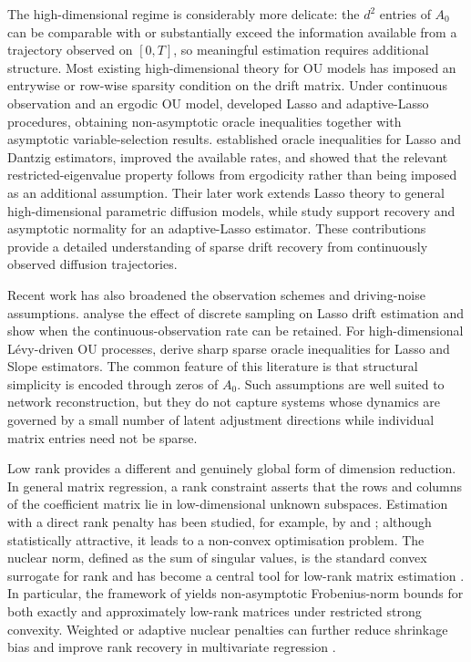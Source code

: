 \documentclass[11pt]{article}
\begin{document}
The high-dimensional regime is considerably more delicate: the $d^2$ entries of $A_0$ can be comparable with or substantially exceed the information available from a trajectory observed on $[0,T]$, so meaningful estimation requires additional structure.
Most existing high-dimensional theory for OU models has imposed an entrywise or row-wise sparsity condition on the drift matrix.  Under continuous observation and an ergodic OU model, \citet{GaiffasMatulewicz2019} developed Lasso and adaptive-Lasso procedures, obtaining non-asymptotic oracle inequalities together with asymptotic variable-selection results.  \citet{CiolekMarushkevychPodolskij2020} established oracle inequalities for Lasso and Dantzig estimators, improved the available rates, and showed that the relevant restricted-eigenvalue property follows from ergodicity rather than being imposed as an additional assumption.  Their later work \citep{CiolekMarushkevychPodolskij2025} extends Lasso theory to general high-dimensional parametric diffusion models, while \citet{MarushkevychPinaPodolskij2025} study support recovery and asymptotic normality for an adaptive-Lasso estimator.  These contributions provide a detailed understanding of sparse drift recovery from continuously observed diffusion trajectories.

Recent work has also broadened the observation schemes and driving-noise assumptions.  \citet{AmorinoPinaPodolskij2025} analyse the effect of discrete sampling on Lasso drift estimation and show when the continuous-observation rate can be retained.  For high-dimensional L\'{e}vy-driven OU processes, \citet{DexheimerJezska2026} derive sharp sparse oracle inequalities for Lasso and Slope estimators.  The common feature of this literature is that structural simplicity is encoded through zeros of $A_0$.  Such assumptions are well suited to network reconstruction, but they do not capture systems whose dynamics are governed by a small number of latent adjustment directions while individual matrix entries need not be sparse.

Low rank provides a different and genuinely global form of dimension reduction.  In general matrix regression, a rank constraint asserts that the rows and columns of the coefficient matrix lie in low-dimensional unknown subspaces.  Estimation with a direct rank penalty has been studied, for example, by \citet{BuneaSheWegkamp2011} and \citet{Klopp2011}; although statistically attractive, it leads to a non-convex optimisation problem.  The nuclear norm, defined as the sum of singular values, is the standard convex surrogate for rank and has become a central tool for low-rank matrix estimation \citep{RechtFazelParrilo2010,NegahbanWainwright2011,Koltchinskii2011}.  In particular, the framework of \citet{NegahbanWainwright2011} yields non-asymptotic Frobenius-norm bounds for both exactly and approximately low-rank matrices under restricted strong convexity.  Weighted or adaptive nuclear penalties can further reduce shrinkage bias and improve rank recovery in multivariate regression \citep{ChenDongChan2013}.
\end{document}
